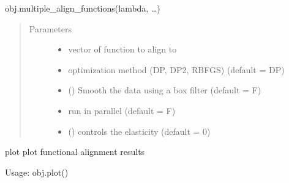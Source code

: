 \documentclass[letterpaper,10pt,english]{sphinxmanual}
\begin{document}
\begin{fulllineitems}
\begin{fulllineitems}
\begin{description}
\end{description}

obj.multiple\_align\_functions(lambda, …)
\begin{quote}\begin{description}
\item[{Parameters}] \leavevmode\begin{itemize}
\item {} 
 \textendash{} vector of function to align to

\item {} 
 \textendash{} optimization method (DP, DP2, RBFGS) (default = DP)

\item {} 
 () \textendash{} Smooth the data using a box filter (default = F)

\item {} 
 \textendash{} run in parallel (default = F)

\item {} 
 () \textendash{} controls the elasticity (default = 0)

\end{itemize}

\end{description}\end{quote}

\end{fulllineitems}


\begin{fulllineitems}
\label{\detokenize{time_warping:time_warping.fdawarp.plot}}
plot plot functional alignment results

Usage: obj.plot()

\end{fulllineitems}



\end{fulllineitems}
\end{document}
